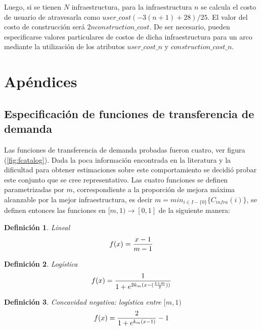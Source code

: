 \documentclass{article}
\newtheorem{definition}{Definición}
\begin{document}
  Luego, si se tienen $N$ infraestructura, para la infraestructura $n$ se calcula el costo de usuario de atravesarla como $user\_cost (-3 (n + 1) + 28) / 25$. El valor del costo de construcción será $2 n construction\_cost$. De ser necesario, pueden especificarse valores particulares de costos de dicha infraestructura para un arco mediante la utilización de los atributos $user\_cost\_n$ y $construction\_cost\_n$.

  \section*{Apéndices}

  \subsection*{Especificación de funciones de transferencia de demanda}

  Las funciones de transferencia de demanda probadas fueron cuatro, ver figura (\ref{fig:fcatalog}). Dada la poca información encontrada en la literatura y la dificultad para obtener estimaciones sobre este comportamiento se decidió probar este conjunto que se cree representativo. Las cuatro funciones se definen parametrizadas por $m$, correspondiente a la proporción de mejora máxima alcanzable por la mejor infraestructura, es decir $m = min_{i \in I - \{0\}} \{ C_{infra}(i) \}$, se definen entonces las funciones en $[m, 1) \rightarrow [0, 1]$ de la siguiente manera:

  \begin{definition}
    Lineal
    \begin{align}
        f(x) = {x -1 \over m - 1}
    \end{align}
  \end{definition}

  \begin{definition}
    Logística
    \begin{align}
        f(x) = {1 \over 1 + e^{2k_m(x - ({1 + m \over 2}))}}
    \end{align}
  \end{definition}

  \begin{definition}
    Concavidad negativa: logística entre $[m, 1)$
    \begin{align}
        f(x) = {2 \over 1 + e^{k_m(x - 1)}} - 1
    \end{align}
  \end{definition}
\end{document}
